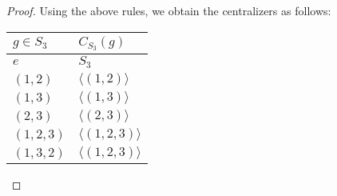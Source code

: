 \documentclass{article}
\begin{document}
\begin{enumerate}
\begin{enumerate}
\begin{proof}
          Using the above rules, we obtain the centralizers as follows:
          \begin{center}
            \begin{tabular}{|l|l|}
              \hline
              $g\in S_3$  & $C_{S_3}(g)$              \\ \hline\hline
              $e$         & $S_3$                     \\ \hline
              $(1,2)$     & $\langle(1,2)\rangle$     \\ \hline
              $(1,3)$     & $\langle(1,3)\rangle$     \\ \hline
              $(2,3)$     & $\langle(2,3)\rangle$     \\ \hline
              $(1,2,3)$   & $\langle(1,2,3)\rangle$   \\ \hline
              $(1,3,2)$   & $\langle(1,2,3)\rangle$   \\ \hline
            \end{tabular}
          \end{center}
        \end{proof}
    \end{enumerate}
\end{enumerate}
\end{document}
